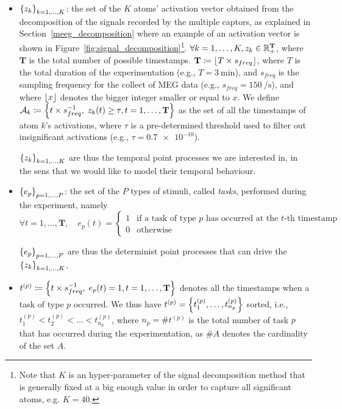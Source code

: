 \begin{itemize}
    \item $\left\lbrace z_k \right\rbrace_{k=1,\dots,K}$: the set of the $K$ atoms' activation vector obtained from the decomposition of the signals recorded by the multiple captors, as explained in Section~\ref{meeg_decomposition} where an example of an activation vector is shown in Figure~\ref{fig:signal_decomposition}\footnote{Note that $K$ is an hyper-parameter of the signal decomposition method that is generally fixed at a big enough value in order to capture all significant atoms, e.g. $K=40$.}.
    ${\forall k=1,\dots,K, z_k\in\mathbb{R}_+^\mathbf{T}}$, where $\mathbf{T}$ is the total number of possible timestamps.
    $\mathbf{T} \coloneqq \left\lfloor T \times s_{freq}\right\rfloor$, where $T$ is the total duration of the experimentation (e.g., $T = \SI{3}{\minute}$), and $s_{freq}$ is the sampling frequency for the collect of MEG data (e.g., $s_{freq} = \SI{150}{\per\second}$), and where $\left\lfloor x\right\rfloor$ denotes the bigger integer smaller or equal to $x$.
    We define $\mathcal{A}_k \coloneqq \left\lbrace t\times s_{freq}^{-1},\; z_k(t)\geq\tau, t=1,\dots, \mathbf{T} \right\rbrace$ as the set of all the timestamps of atom $k$'s activations, where $\tau$ is a pre-determined threshold used to filter out insignificant activations (e.g., $\tau = \num{0.7e-10}$).
    
    $\left\lbrace z_k \right\rbrace_{k=1,\dots,K}$ are thus the temporal point processes we are interested in, in the sens that we would like to model their temporal behaviour.
    
    \item $\left\lbrace e_p \right\rbrace_{p=1,\dots,P}$: the set of the $P$ types of stimuli, called \textit{tasks}, performed during the experiment, namely
    \begin{equation*}
        \forall t=1,\dots,\mathbf{T}, \quad e_p(t)=
        \left\{
		\begin{array}{ll}
			1 & \mbox{if a task of type $p$ has occurred at the $t$-th timestamp}\\
			0 & \mbox{otherwise}
		\end{array}
	\right.
    \end{equation*}

    $\left\lbrace e_p \right\rbrace_{p=1,\dots,P}$ are thus the determinist point processes that can drive the $\left\lbrace z_k \right\rbrace_{k=1,\dots,K}$.
    
    \item $t^{(p)} \coloneqq \left\lbrace t\times s_{freq}^{-1},\; e_p(t)=1, t=1,\dots, \mathbf{T} \right\rbrace$ denotes all the timestamps when a task of type $p$ occurred.
    We thus have $t^{(p)} = \left\lbrace t^{(p)}_1, \dots, t^{(p)}_{n_p} \right\rbrace$ sorted, i.e., $t^{(p)}_1 < t^{(p)}_2 < \dots < t^{(p)}_{n_p}$, where $n_p=\# t^{(p)}$ is the total number of task $p$ that has occurred during the experimentation, as $\# A$ denotes the cardinality of the set $A$.
\end{itemize} 

